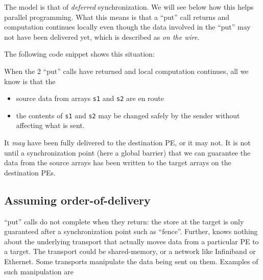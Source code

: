 The \openshmem model is that of \emph{deferred} synchronization.  We
will see below how this helps parallel programming.  What this means
is that a ``put'' call returns and computation continues locally even
though the data involved in the ``put'' may not have been delivered
yet, which is described as \emph{on the wire}.

The following code snippet shows this situation:

\begin{minipage}{\linewidth}
\vspace{0.1in}
\vspace{0.1in}
\end{minipage}

When the 2 ``put'' calls have returned and local computation
continues, all we know is that the

\begin{minipage}{\linewidth}
\begin{itemize}
\item source data from arrays \texttt{s1} and \texttt{s2} are en route
\item the contents of \texttt{s1} and \texttt{s2} may be changed
  safely by the sender without affecting what is sent.
\end{itemize}
\end{minipage}

It \emph{may} have been fully delivered to the destination PE, or it
may not.  It is not until a synchronization point (here a global
barrier) that we can guarantee the data from the source arrays has
been written to the target arrays on the destination PEs.

\subsection{Assuming order-of-delivery}


\openshmem ``put'' calls do not complete when they return: the store
at the target is only guaranteed after a synchronization point such as
``fence''.  Further, \openshmem knows nothing about the underlying
transport that actually moves data from a particular PE to a target.
The transport could be shared-memory, or a network like Infiniband or
Ethernet.  Some transports manipulate the data being sent on them.
Examples of such manipulation are

